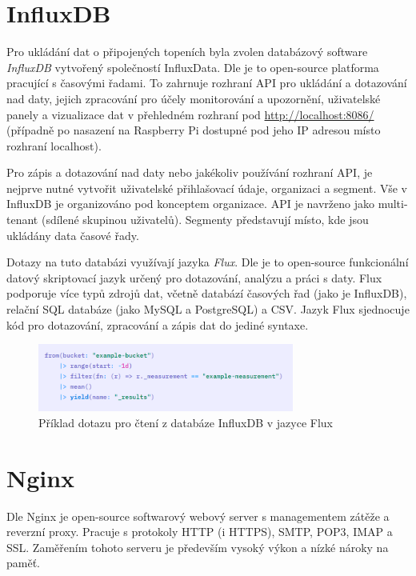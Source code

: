 \section{InfluxDB}
Pro ukládání dat o připojených topeních byla zvolen databázový software {\it InfluxDB} vytvořený společností InfluxData. Dle \cite{influx_gh} je to open-source platforma pracující s časovými řadami. To zahrnuje rozhraní API pro ukládání a dotazování nad daty, jejich zpracování pro účely monitorování a upozornění, uživatelské panely a vizualizace dat v přehledném rozhraní pod \url{http://localhost:8086/} (případně po nasazení na Raspberry Pi dostupné pod jeho IP adresou místo rozhraní localhost).

Pro zápis a dotazování nad daty nebo jakékoliv používání rozhraní API, je nejprve nutné vytvořit uživatelské přihlašovací údaje, organizaci a segment. Vše v InfluxDB je organizováno pod konceptem organizace. API je navrženo jako multi-tenant (sdílené skupinou uživatelů). Segmenty představují místo, kde jsou ukládány data časové řady.

Dotazy na tuto databázi využívají jazyka {\it Flux}. Dle \cite{flux} je to open-source funkcionální datový skriptovací jazyk určený pro dotazování, analýzu a práci s daty. Flux podporuje více typů zdrojů dat, včetně databází časových řad (jako je InfluxDB), relační SQL databáze (jako MySQL a PostgreSQL) a CSV. Jazyk Flux sjednocuje kód pro dotazování, zpracování a zápis dat do jediné syntaxe.

\begin{figure}[hbt]
\centering
\includegraphics[width=0.75\textwidth]{obrazky-figures/flux-example.png}
\caption{Příklad dotazu pro čtení z databáze InfluxDB v jazyce Flux \cite{flux_gs}}
\end{figure}

\section{Nginx}
Dle \cite{nginx_wiki} Nginx je open-source softwarový webový server s managementem zátěže a reverzní proxy. Pracuje s protokoly HTTP (i HTTPS), SMTP, POP3, IMAP a SSL. Zaměřením tohoto serveru je především vysoký výkon a nízké nároky na paměť.

